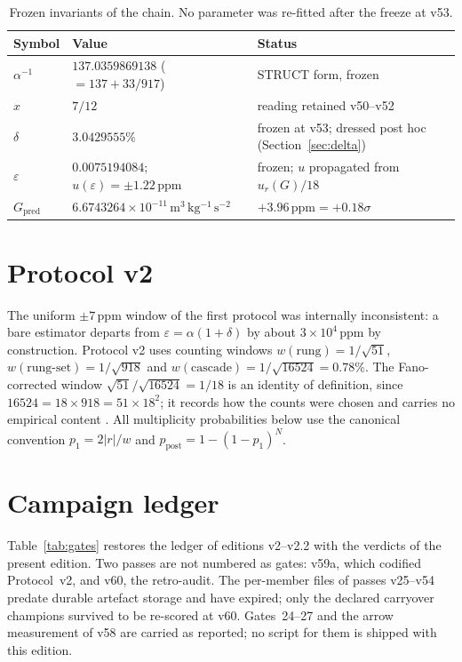 \documentclass[11pt,a4paper]{article}
\newcommand{\ppm}{\ensuremath{\,\mathrm{ppm}}}
\begin{document}
\begin{table}[h]\centering\small
\caption{Frozen invariants of the chain. No parameter was re-fitted after the freeze at v53.}
\label{tab:invariants}
\begin{tabular}{@{}p{}p{}p{}@{}}
\toprule
Symbol & Value & Status \\
\midrule
$\alpha^{-1}$ & $137.0359869138$ ($= 137 + 33/917$) & STRUCT form, frozen \\
$x$ & $7/12$ & reading retained v50--v52 \\
$\delta$ & $3.0429555\%$ & frozen at v53; dressed post hoc (Section~\ref{sec:delta}) \\
$\varepsilon$ & $0.0075194084$; $u(\varepsilon) = \pm 1.22\ppm$ & frozen; $u$ propagated from $u_r(G)/18$ \\
$G_{\mathrm{pred}}$ & $6.6743264\times10^{-11}\,\mathrm{m^3\,kg^{-1}\,s^{-2}}$ & $+3.96\ppm = +0.18\sigma$ \\
\bottomrule
\end{tabular}
\end{table}

\section{Protocol v2}
The uniform $\pm 7\ppm$ window of the first protocol was internally inconsistent: a bare estimator departs from $\varepsilon = \alpha(1+\delta)$ by about $3\times10^{4}\ppm$ by construction. Protocol v2 uses counting windows $w(\text{rung}) = 1/\sqrt{51}$, $w(\text{rung-set}) = 1/\sqrt{918}$ and $w(\text{cascade}) = 1/\sqrt{16524} = 0.78\%$. The Fano-corrected window $\sqrt{51}/\sqrt{16524} = 1/18$ is an identity of definition, since $16524 = 18\times918 = 51\times18^2$; it records how the counts were chosen and carries no empirical content \citep{fano1947}. All multiplicity probabilities below use the canonical convention $p_1 = 2|r|/w$ and $p_{\mathrm{post}} = 1-(1-p_1)^N$.

\section{Campaign ledger}
Table~\ref{tab:gates} restores the ledger of editions v2--v2.2 with the verdicts of the present edition. Two passes are not numbered as gates: v59a, which codified Protocol~v2, and v60, the retro-audit. The per-member files of passes v25--v54 predate durable artefact storage and have expired; only the declared carryover champions survived to be re-scored at v60. Gates~24--27 and the arrow measurement of v58 are carried as reported; no script for them is shipped with this edition.
\end{document}
